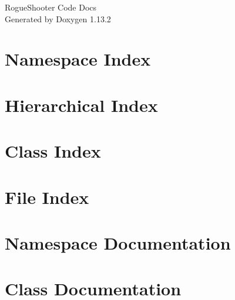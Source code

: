 \documentclass[twoside]{book}
\newcommand{\+}{\discretionary{\mbox{\scriptsize$\hookleftarrow$}}{}{}}
\newcommand{\clearemptydoublepage}{%
    \newpage{\pagestyle{empty}\cleardoublepage}%
  }
\begin{document}
  \raggedbottom
    \hypersetup{pageanchor=false,
                bookmarksnumbered=true,
                pdfencoding=unicode
               }
  \begin{titlepage}
  \vspace*{7cm}
  \begin{center}%
  {\Large Rogue\+Shooter Code Docs}\\
  \vspace*{1cm}
  {\large Generated by Doxygen 1.13.2}\\
  \end{center}
  \end{titlepage}
  \clearemptydoublepage
  \tableofcontents
  \clearemptydoublepage
  \hypersetup{pageanchor=true}
\chapter{Namespace Index}

\chapter{Hierarchical Index}

\chapter{Class Index}

\chapter{File Index}

\chapter{Namespace Documentation}

\chapter{Class Documentation}





































\end{document}
